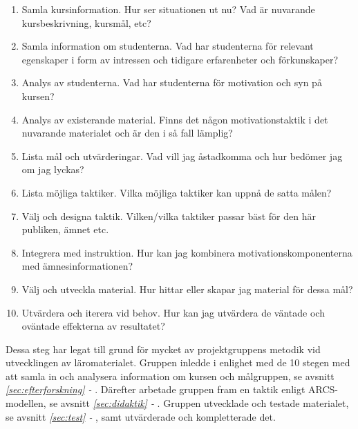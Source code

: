 \documentclass[12pt,a4paper,twoside,openright]{article}
\begin{document}
\begin{enumerate}
\item Samla kursinformation. Hur ser situationen ut nu? Vad är
 nuvarande kursbeskrivning, kursmål, etc?

\item Samla information om studenterna. Vad har studenterna
 för relevant egenskaper i form av intressen och tidigare
 erfarenheter och förkunskaper?

\item Analys av studenterna. Vad har studenterna för motivation och
 syn på kursen?

\item Analys av existerande material. Finns det någon
 motivationstaktik i det nuvarande materialet och är den i så fall
 lämplig?

\item Lista mål och utvärderingar. Vad vill jag åstadkomma och hur
 bedömer jag om jag lyckas?

\item Lista möjliga taktiker. Vilka möjliga taktiker kan uppnå de
 satta målen?

\item Välj och designa taktik. Vilken/vilka taktiker passar bäst för
 den här publiken, ämnet etc.

\item Integrera med instruktion. Hur kan jag kombinera
 motivationskomponenterna med ämnesinformationen?

\item Välj och utveckla material. Hur hittar eller skapar jag material
 för dessa mål?

\item Utvärdera och iterera vid behov. Hur kan jag utvärdera de
 väntade och oväntade effekterna av resultatet?

\end{enumerate}

Dessa steg har legat till grund för mycket av projektgruppens metodik 
vid utvecklingen av läromaterialet. Gruppen inledde i enlighet med de 10 stegen med att samla
in och analysera information om kursen och målgruppen, se avsnitt
\textit{\ref{sec:efterforskning} - }.
Därefter arbetade gruppen fram en taktik enligt ARCS-modellen, se avsnitt \textit{\ref{sec:didaktik}
- }. Gruppen utvecklade och testade materialet, se avsnitt \textit{\ref{sec:test}
- }, samt utvärderade och kompletterade det.
\end{document}
